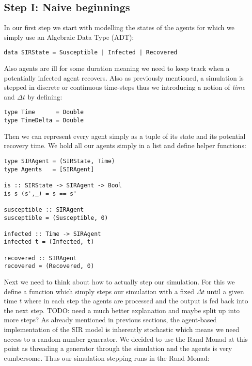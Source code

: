 \subsection*{Step I: Naive beginnings}
In our first step we start with modelling the states of the agents for which we simply use an Algebraic Data Type (ADT):

\begin{verbatim}
data SIRState = Susceptible | Infected | Recovered
\end{verbatim}

Also agents are ill for some duration meaning we need to keep track when a potentially infected agent recovers. Also as previously mentioned, a simulation is stepped in discrete or continuous time-steps thus we introducing a notion of \textit{time} and $\Delta t$ by defining:

\begin{verbatim}
type Time      = Double
type TimeDelta = Double
\end{verbatim}

Then we can represent every agent simply as a tuple of its state and its potential recovery time. We hold all our agents simply in a list and define helper functions:
\begin{verbatim}
type SIRAgent = (SIRState, Time)
type Agents   = [SIRAgent]

is :: SIRState -> SIRAgent -> Bool
is s (s',_) = s == s'

susceptible :: SIRAgent
susceptible = (Susceptible, 0)

infected :: Time -> SIRAgent
infected t = (Infected, t)

recovered :: SIRAgent
recovered = (Recovered, 0)
\end{verbatim}

Next we need to think about how to actually step our simulation. For this we define a function which simply steps our simulation with a fixed $\Delta t$ until a given time $t$ where in each step the agents are processed and the output is fed back into the next step.
TODO: need a much better explanation and maybe split up into more steps?
As already mentioned in previous sections, the agent-based implementation of the SIR model is inherently stochastic which means we need access to a random-number generator. We decided to use the Rand Monad at this point as threading a generator through the simulation and the agents is very cumbersome. Thus our simulation stepping runs in the Rand Monad:

